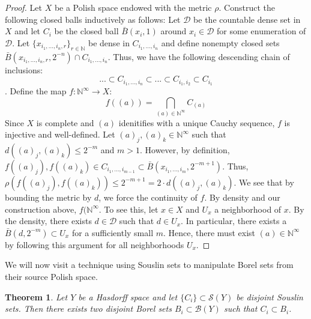 \documentclass[12pt]{article}
\newtheorem{theorem}{Theorem}[section]
\theoremstyle{remark}
\begin{document}
\begin{proof}
Let $X$ be a Polish space endowed with the metric $\rho$. Construct the following closed balls inductively as follows:
Let $\mathcal{D}$ be the countable dense set in $X$ and let $C_i$ be the closed ball $\bar{B}(x_i,1)$ around $x_i \in \mathcal{D}$ for some enumeration of $\mathcal{D}$. Let $\{x_{i_1,...,i_n,r}\}_{r \in \mathbb{N}}$ be dense in $C_{i_1,...,i_n}$ and define nonempty closed sets $\bar{B}(x_{i_1,...,i_n,r},2^{-n}) \cap C_{i_1,...,i_n}$. Thus, we have the following descending chain of inclusions: $$ ... \subset C_{i_1,...,i_n} \subset ... \subset C_{i_1,i_2}\subset C_{i_1}$$.
Define the map $f:\mathbb{N}^{\infty} \rightarrow X$:
$$f((a)) = \bigcap_{(a) \in \mathbb{N}^{\infty}} C_{(a)} $$
Since $X$ is complete and $(a)$ idenitifies with a unique Cauchy sequence, $f$ is injective and well-defined. Let $(a)_j,(a)_k \in \mathbb{N}^{\infty}$ such that $d((a)_j,(a)_k) \leq 2^{-m}$ and $m > 1$. However, by definition, $f((a)_j),f((a)_k) \in C_{i_1,...,i_{m-1}} \subset \bar{B}(x_{i_1,...,i_{m}},2^{-m+1})$. Thus, $\rho(f((a)_j),f((a)_k)) \leq 2^{-m+1} = 2 \cdot d((a)_j,(a)_k)$. We see that by bounding the metric by $d$, we force the continuity of $f$. By density and our construction above, $f(\mathbb{N}^{\infty}$. To see this, let $x \in X$ and $U_x$ a neighborhood of $x$. By the density, there exists $d \in \mathcal{D}$ such that $d \in U_x$. In particular, there exists a $\bar{B}(d,2^{-m}) \subset U_x$ for a sufficiently small $m$. Hence, there must exist $(a) \in \mathbb{N}^{\infty}$ by following this argument for all neighborhoods $U_x$.
\end{proof}

We will now visit a technique using Souslin sets to manipulate Borel sets from their source Polish space. 

\begin{theorem}
Let $Y$ be a Hasdorff space and let $\{C_i\} \subset \mathcal{S}(Y)$ be disjoint Souslin sets. Then there exists two disjoint Borel sets $B_i \subset \mathcal{B}(Y)$ such that $C_i \subset B_i$.
\end{theorem}
\end{document}

